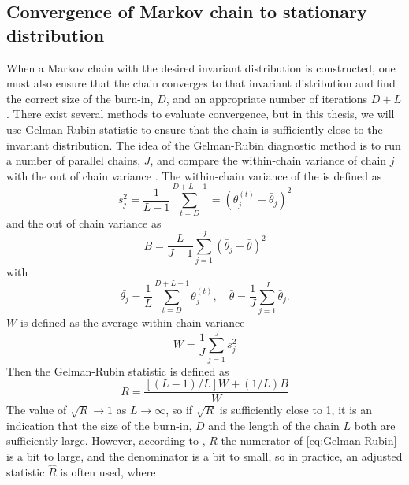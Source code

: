 \subsection{Convergence of Markov chain to stationary distribution}\label{sec:convergence}
When a Markov chain with the desired invariant distribution is constructed, one must also ensure that the chain converges to that invariant distribution and find the correct size of the burn-in, $D$, and an appropriate number of iterations $D+L$. There exist several  methods to evaluate convergence, but in this thesis, we will use Gelman-Rubin statistic to ensure that the chain is sufficiently close to the invariant distribution. The idea of the Gelman-Rubin diagnostic method is to run a number of parallel chains, $J$, and compare the within-chain variance of chain $j$ with the out of chain variance \cite{CS}. The within-chain variance of the is defined as 
\begin{equation*}
    s_j^2 = \frac{1}{L-1}\sum_{t = D}^{D + L - 1} = \left(\theta_j^{\left(t\right)} - \bar{\theta}_j\right)^2
\end{equation*}
and the out of chain variance as 
\begin{equation*}
    B = \frac{L}{J-1}\sum_{j=1}^J \left(\bar{\theta}_j - \bar{\theta}\right)^2
\end{equation*}
with 
\begin{equation*}
    \bar{\theta_j} = \frac{1}{L}\sum_{t = D}^{D+L-1} \theta_j^{\left(t\right)}, \quad \bar{\theta} = \frac{1}{J} \sum_{j=1}^J \bar{\theta}_j.
\end{equation*} 
$W$ is defined as the average within-chain variance 
\begin{equation*}
    W = \frac{1}{J} \sum_{j = 1}^J{s_j^2}
\end{equation*}
Then the Gelman-Rubin statistic is defined as 
\begin{equation}\label{eq:Gelman-Rubin}
    R = \frac{\left[\left(L-1\right)/L\right]W + \left(1/L\right)B}{W}
\end{equation}
The value of $\sqrt{R} \xrightarrow{} 1$ as $L \xrightarrow{} \infty$, so if $\sqrt{R}$ is sufficiently close to 1, it is an indication that the size of the burn-in, $D$ and the length of the chain $L$ both are sufficiently large. However, according to \cite{CS}, $R$ the numerator of \eqref{eq:Gelman-Rubin} is a bit to large, and the denominator is a bit to small, so in practice, an adjusted statistic $\hat{R}$ is often used, where
